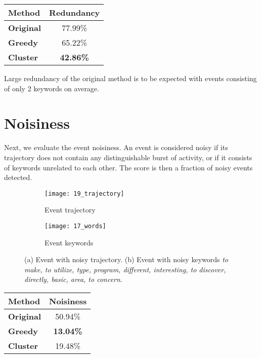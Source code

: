 \hspace{\fill}

\begin{minipage}{\linewidth}
\centering
\begin{tabular}{ l c }\toprule[1.5pt]
\bf Method 	 & \bf Redundancy \\ \midrule
\bf Original &  77.99\% \\
\bf Greedy   &  65.22\% \\
\bf Cluster &  \bf 42.86\% \\ \bottomrule[1.25pt]
\end {tabular}\par
{} \label{tab:title} 
\end{minipage}

\hspace{\fill}

Large redundancy of the original method is to be expected with events consisting of only 2 keywords on average.

\section{Noisiness} \label{sec:noise-evaluation}

Next, we evaluate the event noisiness. An event is considered noisy if its trajectory does not contain any distinguishable burst of activity, or if it consists of keywords unrelated to each other. The score is then a fraction of noisy events detected.


\begin{figure}[H]
\centering
\begin{subfigure}{.5\textwidth}
  \centering
  \texttt{[image: 19\_trajectory]}  %
  \caption{Event trajectory}
  \label{fig:noisy-trajectory}
\end{subfigure}%
\begin{subfigure}{.5\textwidth}
  \centering
  \texttt{[image: 17\_words]}  %
  \caption{Event keywords}
  \label{fig:noisy-keywords}
\end{subfigure}
\caption{(a) Event with noisy trajectory. (b) Event with noisy keywords \textit{to make, to utilize, type, program, different, interesting, to discover, directly, basic, area, to concern}.}
\end{figure}


\hspace{\fill}

\begin{minipage}{\linewidth}
\centering
\begin{tabular}{ l c }\toprule[1.5pt]
\bf Method 	 & \bf Noisiness \\ \midrule
\bf Original &  50.94\% \\
\bf Greedy   &  \bf 13.04\% \\
\bf Cluster &  19.48\% \\ \bottomrule[1.25pt]
\end {tabular}\par
{} \label{tab:title} 
\end{minipage}

